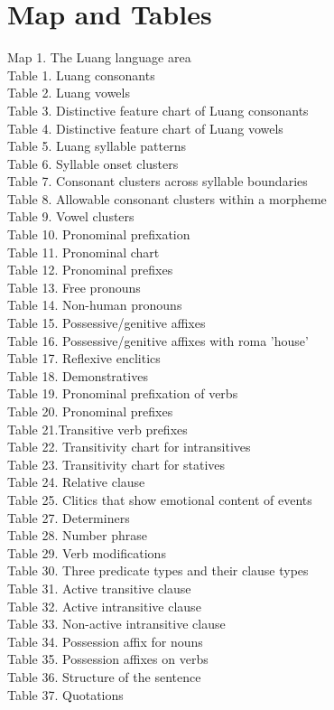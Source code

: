 \documentclass[10pt]{article}
\begin{document}
\section*{Map and Tables}
Map 1. The Luang language area\\
Table 1. Luang consonants\\
Table 2. Luang vowels\\
Table 3. Distinctive feature chart of Luang consonants\\
Table 4. Distinctive feature chart of Luang vowels\\
Table 5. Luang syllable patterns\\
Table 6. Syllable onset clusters\\
Table 7. Consonant clusters across syllable boundaries\\
Table 8. Allowable consonant clusters within a morpheme\\
Table 9. Vowel clusters\\
Table 10. Pronominal prefixation\\
Table 11. Pronominal chart\\
Table 12. Pronominal prefixes\\
Table 13. Free pronouns\\
Table 14. Non-human pronouns\\
Table 15. Possessive/genitive affixes\\
Table 16. Possessive/genitive affixes with roma 'house'\\
Table 17. Reflexive enclitics\\
Table 18. Demonstratives\\
Table 19. Pronominal prefixation of verbs\\
Table 20. Pronominal prefixes\\
Table 21.Transitive verb prefixes\\
Table 22. Transitivity chart for intransitives\\
Table 23. Transitivity chart for statives\\
Table 24. Relative clause\\
Table 25. Clitics that show emotional content of events\\
Table 27. Determiners\\
Table 28. Number phrase\\
Table 29. Verb modifications\\
Table 30. Three predicate types and their clause types\\
Table 31. Active transitive clause\\
Table 32. Active intransitive clause\\
Table 33. Non-active intransitive clause\\
Table 34. Possession affix for nouns\\
Table 35. Possession affixes on verbs\\
Table 36. Structure of the sentence\\
Table 37. Quotations
\end{document}

